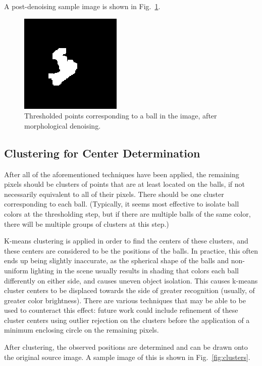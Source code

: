 \documentclass[letterpaper, 10 pt, conference]{ieeeconf}  %
\begin{document}
A post-denoising sample image is shown in Fig.~\ref{fig:denoised}.

\begin{figure}
\centering
    \includegraphics{denoised.png}
    \caption{Thresholded points corresponding to a ball in the image, after morphological denoising.}
    \label{fig:denoised}
\end{figure}

\subsection{Clustering for Center Determination}

After all of the aforementioned techniques have been applied, the remaining pixels should be clusters of points that are at least located on the balls, if not necessarily equivalent to all of their pixels. There should be one cluster corresponding to each ball. (Typically, it seems most effective to isolate ball colors at the thresholding step, but if there are multiple balls of the same color, there will be multiple groups of clusters at this step.)

K-means clustering is applied in order to find the centers of these clusters, and these centers are considered to be the positions of the balls. In practice, this often ends up being slightly inaccurate, as the spherical shape of the balls and non-uniform lighting in the scene usually results in shading that colors each ball differently on either side, and causes uneven object isolation. This causes k-means cluster centers to be displaced towards the side of greater recognition (usually, of greater color brightness). There are various techniques that may be able to be used to counteract this effect: future work could include refinement of these cluster centers using outlier rejection on the clusters before the application of a minimum enclosing circle on the remaining pixels.

After clustering, the observed positions are determined and can be drawn onto the original source image. A sample image of this is shown in Fig.~\ref{fig:clusters}.
\end{document}
